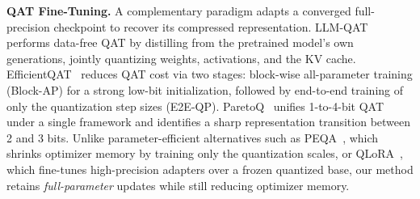 \documentclass{article} %
\begin{document}
\textbf{QAT Fine-Tuning.}
A complementary paradigm adapts a converged full-precision checkpoint to recover its compressed representation. 
LLM-QAT~\citep{liu2024llmqat} performs data-free QAT by distilling from the pretrained model's own generations, jointly quantizing weights, activations, and the KV cache. 
EfficientQAT~\citep{chen2025efficientqat} reduces QAT cost via two stages: block-wise all-parameter training (Block-AP) for a strong low-bit initialization, followed by end-to-end training of only the quantization step sizes (E2E-QP). 
ParetoQ~\citep{liu2026paretoq} unifies 1-to-4-bit QAT under a single framework and identifies a sharp representation transition between 2 and 3 bits. 
Unlike parameter-efficient alternatives such as PEQA~\citep{kim2023memory}, which shrinks optimizer memory by training only the quantization scales, or QLoRA~\citep{dettmers2023qlora}, which fine-tunes high-precision adapters over a frozen quantized base, our method retains \emph{full-parameter} updates while still reducing optimizer memory.
\end{document}
